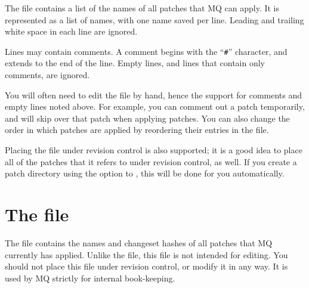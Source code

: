 The  file contains a list of the names of all
patches that MQ can apply.  It is represented as a list of names, with
one name saved per line.  Leading and trailing white space in each
line are ignored.

Lines may contain comments.  A comment begins with the ``\texttt{\#}''
character, and extends to the end of the line.  Empty lines, and lines
that contain only comments, are ignored.

You will often need to edit the  file by hand, hence
the support for comments and empty lines noted above.  For example,
you can comment out a patch temporarily, and  will skip
over that patch when applying patches.  You can also change the order
in which patches are applied by reordering their entries in the
 file.

Placing the  file under revision control is also
supported; it is a good idea to place all of the patches that it
refers to under revision control, as well.  If you create a patch
directory using the  option to , this
will be done for you automatically.

\section{The  file}

The  file contains the names and changeset hashes of
all patches that MQ currently has applied.  Unlike the
 file, this file is not intended for editing.  You
should not place this file under revision control, or modify it in any
way.  It is used by MQ strictly for internal book-keeping.

